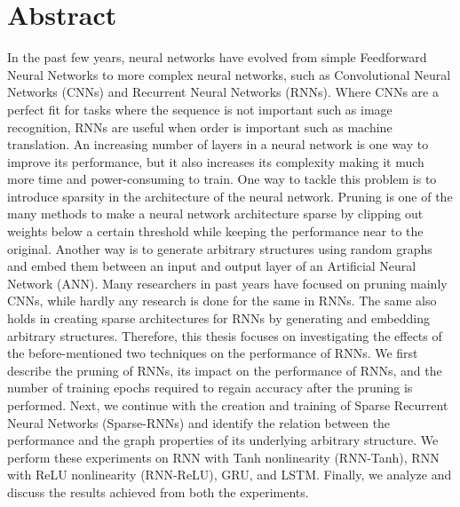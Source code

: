 \chapter*{Abstract}
In the past few years, neural networks have evolved from simple Feedforward Neural Networks to more complex neural networks, such as Convolutional Neural Networks (CNNs) and Recurrent Neural Networks (RNNs). Where CNNs are a perfect fit for tasks where the sequence is not important such as image recognition, RNNs are useful when order is important such as machine translation. An increasing number of layers in a neural network is one way to improve its performance, but it also increases its complexity making it much more time and power-consuming to train. One way to tackle this problem is to introduce sparsity in the architecture of the neural network. Pruning is one of the many methods to make a neural network architecture sparse by clipping out weights below a certain threshold while keeping the performance near to the original. Another way is to generate arbitrary structures using random graphs and embed them between an input and output layer of an Artificial Neural Network (ANN). Many researchers in past years have focused on pruning mainly CNNs, while hardly any research is done for the same in RNNs. The same also holds in creating sparse architectures for RNNs by generating and embedding arbitrary structures. Therefore, this thesis focuses on investigating the effects of the before-mentioned two techniques on the performance of RNNs. We first describe the pruning of RNNs, its impact on the performance of RNNs, and the number of training epochs required to regain accuracy after the pruning is performed. Next, we continue with the creation and training of Sparse Recurrent Neural Networks (Sparse-RNNs) and identify the relation between the performance and the graph properties of its underlying arbitrary structure. We perform these experiments on RNN with Tanh nonlinearity (RNN-Tanh), RNN with ReLU nonlinearity (RNN-ReLU), GRU, and LSTM. Finally, we analyze and discuss the results achieved from both the experiments.